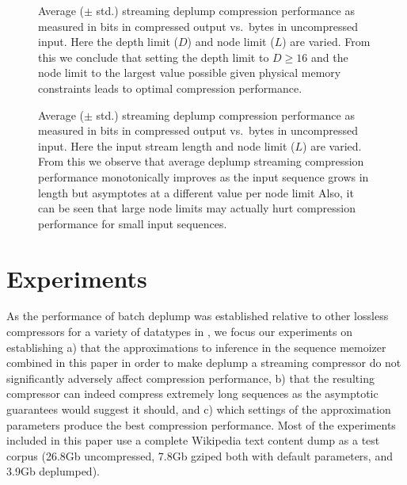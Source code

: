 %
\begin{figure*}[t] 
	\begin{center}
		\caption{Average ($\pm$ std.) streaming deplump compression performance as measured in bits in compressed output vs.~bytes in uncompressed input.  Here the depth limit ($D$) and node limit ($L$) are varied.  From this we conclude that setting the depth limit to $D\geq16$ and the node limit to the largest value possible given physical memory constraints leads to optimal compression performance.}
		\label{fig:varying_depths}
	\end{center} 
\end{figure*} 
%
%
\begin{figure*}[t] 
	\begin{center}
		\caption{Average ($\pm$ std.) streaming deplump compression performance as measured in bits in compressed output vs.~bytes in uncompressed input.  Here the input stream length and node limit ($L$) are varied.  From this we observe that average deplump streaming compression performance monotonically improves as the input sequence grows in length but asymptotes at a different value per node limit  Also, it can be seen that large node limits may actually hurt compression performance for small input sequences.}
		\label{fig:varying_stream_length}
	\end{center} 
\end{figure*} 
%
\section{Experiments}
\label{sec:experiments}

As the performance of batch deplump was established relative to other lossless compressors for a variety of datatypes in \citep{Gasthaus2010}, we focus our experiments on establishing a) that the approximations to inference in the sequence memoizer combined in this paper in order to make deplump a streaming compressor do not significantly adversely affect compression performance, b) that the resulting compressor can indeed compress extremely long sequences as the asymptotic guarantees would suggest it should, and c) which settings of the approximation parameters produce the best compression performance.
Most of the experiments included in this paper use a complete Wikipedia text content dump \citep{Wikipedia2010} as a test corpus (26.8Gb uncompressed, 7.8Gb gziped %
both with default parameters, and 3.9Gb deplumped).  

